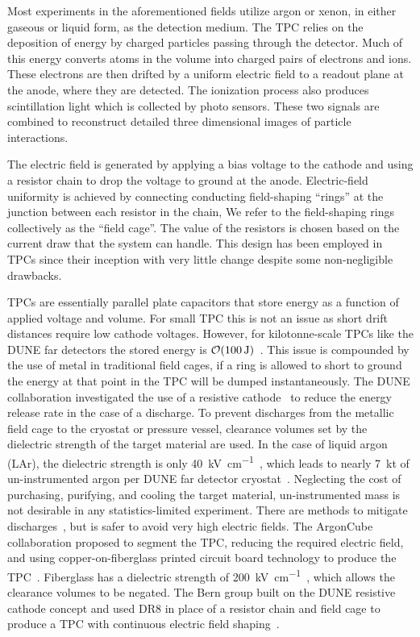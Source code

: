 \documentclass[a4paper,12pt]{article}
\newcommand{\DR}{DR8}
\begin{document}
Most experiments in the aforementioned fields utilize argon or xenon, in either gaseous or liquid form, as the detection medium. 
The TPC relies on the deposition of energy by charged particles passing through the detector. 
Much of this energy converts atoms in the volume into charged pairs of electrons and ions. 
These electrons are then drifted by a uniform electric field to a readout plane at the anode, where they are detected. 
The ionization process also produces scintillation light which is collected by photo sensors. 
These two signals are combined to reconstruct detailed three dimensional images of particle interactions.

The electric field is generated by applying a bias voltage to the cathode and using a resistor chain to drop the voltage to ground at the anode.  
Electric-field uniformity is achieved by connecting conducting field-shaping ``rings'' at the junction between each resistor in the chain, We refer to the field-shaping rings collectively as the ``field cage''. 
The value of the resistors is chosen based on the current draw that the system can handle.
This design has been employed in TPCs since their inception with very little change despite some non-negligible drawbacks. 

TPCs are essentially parallel plate capacitors that store energy as a function of applied voltage and volume. 
For small TPC this is not an issue as short drift distances require low cathode voltages.
However, for kilotonne-scale TPCs like the DUNE far detectors the stored energy is $\order{\SI{100}{\joule}}$~\cite{Acciarri:2016ooe}.
This issue is compounded by the use of metal in traditional field cages, if a ring is allowed to short to ground the energy at that point in the TPC will be dumped instantaneously. 
The DUNE collaboration investigated the use of a resistive cathode~\cite{DUNE:2017pqt} to reduce the energy release rate in the case of a discharge.
To prevent discharges from the metallic field cage to the cryostat or pressure vessel, clearance volumes set by the dielectric strength of the target material are used. 
In the case of liquid argon (LAr), the dielectric strength is only \SI{40}{\kilo\volt\per\centi\metre}~\cite{MicroBooNE:2014php}, which leads to nearly \SI{7}{\kilo\tonne} of un-instrumented argon per DUNE far detector cryostat~\cite{Acciarri:2016ooe}.
Neglecting the cost of purchasing, purifying, and cooling the target material, un-instrumented mass is not desirable in any statistics-limited experiment.        
There are methods to mitigate discharges~\cite{Auger:2014eba}, but is safer to avoid very high electric fields.  
The ArgonCube collaboration proposed to segment the TPC, reducing the required electric field, and using copper-on-fiberglass printed circuit board technology to produce the TPC~\cite{Auger:2268439}. 
Fiberglass has a dielectric strength of \SI{200}{\kilo\volt\per\centi\metre}~\cite{5071132}, which allows the clearance volumes to be negated.
The Bern group built on the DUNE resistive cathode concept and used {\DR} in place of a resistor chain and field cage to produce a TPC with continuous electric field shaping~\cite{bern_lartpc}.   
\end{document}
